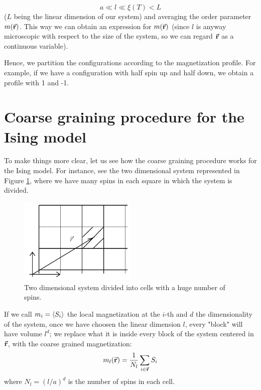 \documentclass[../main/main.tex]{subfiles}
\begin{document}
\begin{equation}
  a \ll l \ll \xi (T) < L
  \label{eq:17_1}
\end{equation}
(\( L \)  being the linear dimension of our system) and averaging the order parameter  \( m(\va{r}) \).  This way we can obtain an expression for \( m(\va{r}) \) (since \( l \) is anyway microscopic with respect to the size of the system, so we can regard  \( \va{r} \) as a continuous variable).

\begin{remark}
Hence, we partition the configurations according to the magnetization profile. For example, if we have a configuration with half spin up and half down, we obtain a profile with 1 and -1.
\end{remark}

\section{Coarse graining procedure for the Ising model}
To make things more clear, let us see how the coarse graining procedure works for the Ising model. For instance, see the two dimensional system represented in Figure \ref{fig:17_1}, where we have many spins in each square in which the system is divided.

\begin{figure}[h!]
\centering
\includegraphics[width=0.5\textwidth]{../lessons/17_image/1.pdf}
\caption{\label{fig:17_1} Two dimensional system divided into cells with a huge number of spins.}
\end{figure}

If we call \( m_i = \expval{S_i}  \) the local magnetization at the \( i \)-th  and \( d \) the dimensionality of the system, once we have choosen the linear dimension \( l \), every "block" will have volume \( l^d \); we replace what it is inside every block of the system centered in \( \va{r} \), with the coarse grained magnetization:
\begin{equation}
  m_l (\va{r}) = \frac{1}{N_l} \sum_{i \in \va{r}}^{} S_i
\end{equation}
where \( N_l = (l/a)^d \) is the number of spins in each cell.
\end{document}
